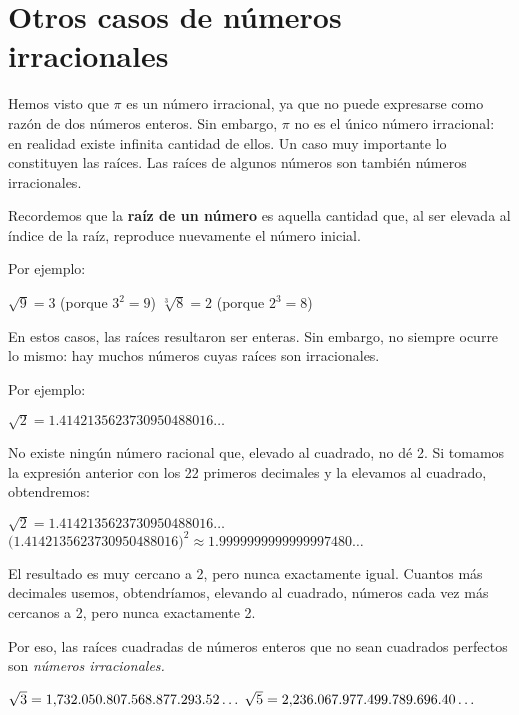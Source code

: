 {\section*{Otros casos de números irracionales}
Hemos visto que $\pi$ es un número irracional, ya que no puede expresarse como razón de dos números enteros.
Sin embargo, $\pi$ no es el único número irracional: en realidad existe infinita cantidad de ellos.
Un caso muy importante lo constituyen las raíces. Las raíces de algunos números son también números irracionales.

Recordemos que la \textbf{raíz de un número} es aquella cantidad que, al ser elevada al índice de la raíz, 
reproduce nuevamente el número inicial.  
\clearpage

Por ejemplo:

\begin{ejemplosplain}[2]
  \task $\sqrt{9}=3$ \quad (porque $3^2=9$)
  \task $\sqrt[3]{8}=2$ \quad (porque $2^3=8$)
\end{ejemplosplain}


En estos casos, las raíces resultaron ser enteras.  
Sin embargo, no siempre ocurre lo mismo: hay muchos números cuyas raíces son irracionales.  

Por ejemplo:

\begin{ejemplosplain}
  \task $\sqrt{2} = \num{1.4142135623730950488016}\ldots$
\end{ejemplosplain}


No existe ningún número racional que, elevado al cuadrado, no dé 2.  Si tomamos la expresión
anterior con los 22 primeros decimales y la elevamos al cuadrado, obtendremos:

\begin{ejemplos}[1][\textbullet]
  \task $\sqrt{2} = 1.41421356237309504880\allowbreak 16\ldots$
  \task $\bigl(1.41421356237309504880\allowbreak 16\bigr)^2 \approx 1.9999999999999997480\ldots$
\end{ejemplos}

El resultado es muy cercano a 2, pero nunca exactamente igual.  
Cuantos más decimales usemos, obtendríamos, elevando al cuadrado, números cada vez más cercanos
a 2, pero nunca exactamente 2.  

Por eso, las raíces cuadradas de números enteros que no sean cuadrados perfectos son \textit{números irracionales.} 

\begin{ejemplosplain}[2]
  \task $\sqrt{3} = \numes{1.73205080756887729352}\ldots$
  \task $\sqrt{5} = \numes{2.23606797749978969640}\ldots$
\end{ejemplosplain}


}
